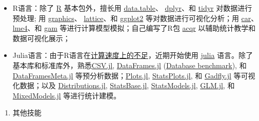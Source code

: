 \documentclass[
  12pt,
]{article}
\providecommand{\tightlist}{%
  \setlength{\itemsep}{0pt}\setlength{\parskip}{0pt}}
\begin{document}
\begin{itemize}
\item
  R语言：除了 \href{https://www.r-project.org}{R} 基本包外，擅长用
  \href{http://r-datatable.com}{data.table}、
  \href{https://cran.r-project.org/web/packages/dplyr/index.html}{dplyr}、和
  \href{https://cran.r-project.org/web/packages/tidyr/index.html}{tidyr}
  对数据进行预处理; 用
  \href{https://stat.ethz.ch/R-manual/R-devel/library/graphics/html/00Index.html}{graphics}、
  \href{https://cran.r-project.org/package=lattice}{lattice}、和
  \href{http://ggplot2.tidyverse.org}{ggplot2}
  等对数据进行可视化分析；用
  \href{https://cran.r-project.org/web/packages/car/index.html}{car}、\href{https://github.com/lme4/lme4}{lme4}、和
  \href{https://cran.r-project.org/web/packages/gam/index.html}{gam}
  等进行计算模型模拟；自己编写了R包
  \href{https://github.com/likanzhan/acqr}{acqr}
  以辅助统计教学和数据可视化展示；
\item
  Julia语言：由于R语言在\href{https://julialang.org/benchmarks/}{计算速度上的不足}，近期开始使用
  \href{https://julialang.org}{julia}
  语言。除了基本库和标准库外，熟悉\href{https://github.com/JuliaData/CSV.jl}{CSV.jl},
  \href{https://github.com/JuliaData/DataFrames.jl}{DataFrames.jl}
  (\href{https://h2oai.github.io/db-benchmark/}{Database benchmark}), 和
  \href{https://github.com/JuliaData/DataFramesMeta.jl}{DataFramesMeta.jl}
  等预分析数据；\href{https://github.com/JuliaPlots/Plots.jl}{Plots.jl},
  \href{https://github.com/JuliaPlots/StatsPlots.jl}{StatsPlots.jl}, 和
  \href{https://github.com/GiovineItalia/Gadfly.jl}{Gadfly.jl}
  等可视化数据；以及
  \href{https://github.com/JuliaStats/Distributions.jl}{Distributions.jl},
  \href{https://github.com/JuliaStats/StatsBase.jl}{StatsBase.jl},
  \href{https://github.com/JuliaStats/StatsModels.jl}{StatsModels.jl},
  \href{https://github.com/JuliaStats/GLM.jl}{GLM.jl}, 和
  \href{https://github.com/JuliaStats/MixedModels.jl}{MixedModels.jl}
  等进行统计建模。
\end{itemize}

\begin{enumerate}
\def\labelenumi{\arabic{enumi}.}
\setcounter{enumi}{2}
\tightlist
\item
  其他技能
\end{enumerate}
\end{document}

